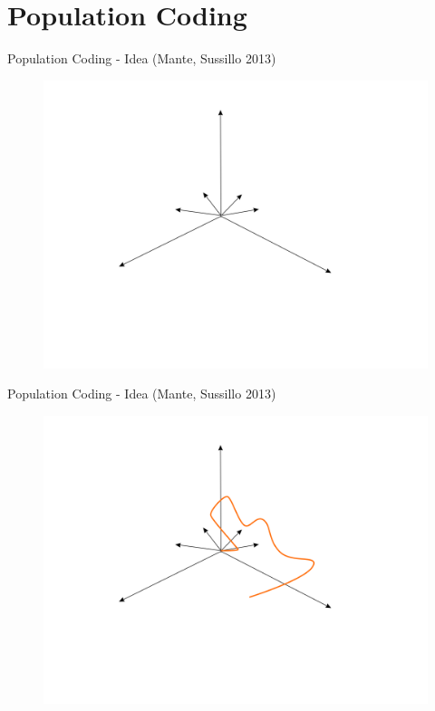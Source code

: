 \documentclass[10pt]{beamer}
\begin{document}
\section{Population Coding}

\begin{frame}[fragile]{Population Coding - Idea (Mante, Sussillo 2013)}
\begin{center}
	\begin{figure}
      \includegraphics[width=1.0\textwidth]{coord.png}
	\end{figure}
	\end{center}
\end{frame}

\begin{frame}[fragile]{Population Coding - Idea (Mante, Sussillo 2013)}
\begin{center}
	\begin{figure}
      \includegraphics[width=1.0\textwidth]{traj.png}
	\end{figure}
	\end{center}
\end{frame}
\end{document}

